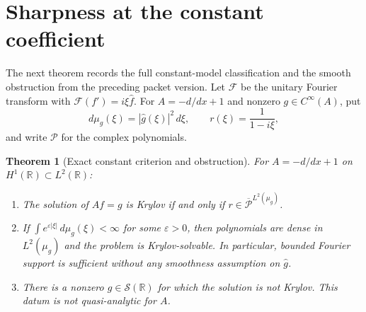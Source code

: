 \documentclass[11pt]{article}
\newtheorem{theorem}{Theorem}
\newcommand{\R}{\mathbb{R}}
\newcommand{\F}{\mathcal{F}}
\newcommand{\Pcal}{\mathcal{P}}
\begin{document}
\section*{Sharpness at the constant coefficient}

The next theorem records the full constant-model classification and the
smooth obstruction from the preceding packet version.  Let $\F$ be the
unitary Fourier transform with $\F(f')=i\xi\widehat f$.  For
$A=-d/dx+1$ and nonzero $g\in C^\infty(A)$, put
\[
 d\mu_g(\xi)=|\widehat g(\xi)|^2\,d\xi,
 \qquad r(\xi)=\frac1{1-i\xi},
\]
and write $\Pcal$ for the complex polynomials.

\begin{theorem}[Exact constant criterion and obstruction]\label{thm:constant}
For $A=-d/dx+1$ on $H^1(\R)\subset L^2(\R)$:
\begin{enumerate}[label=\textup{(\roman*)}]
\item The solution of $Af=g$ is Krylov if and only if
$r\in\overline{\Pcal}^{L^2(\mu_g)}$.
\item If $\int e^{\varepsilon|\xi|}\,d\mu_g(\xi)<\infty$ for some
$\varepsilon>0$, then polynomials are dense in $L^2(\mu_g)$ and the problem
is Krylov-solvable.  In particular, bounded Fourier support is sufficient
without any smoothness assumption on $\widehat g$.
\item There is a nonzero $g\in\mathcal S(\R)$ for which the solution is not
Krylov.  This datum is not quasi-analytic for $A$.
\end{enumerate}
\end{theorem}
\end{document}

